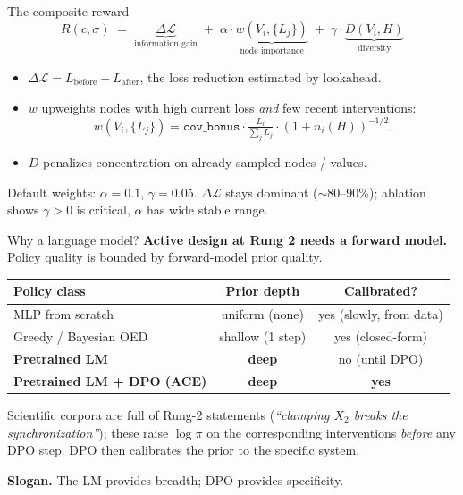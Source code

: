 \documentclass[aspectratio=169,10pt]{beamer}
\begin{document}
\begin{frame}{The composite reward}
\[
R(c,\sigma) \;=\; \underbrace{\Delta\mathcal{L}}_{\text{information gain}}
                  \;+\; \alpha\!\cdot\!\underbrace{w(V_i,\{L_j\})}_{\text{node importance}}
                  \;+\; \gamma\!\cdot\!\underbrace{D(V_i,H)}_{\text{diversity}}
\]
\begin{itemize}
\item $\Delta\mathcal{L} = L_\text{before}\!-\!L_\text{after}$, the loss reduction estimated by lookahead.
\item $w$ upweights nodes with high current loss \emph{and} few recent interventions:
  \[ w(V_i,\{L_j\})=\texttt{cov\_bonus}\cdot\tfrac{L_i}{\sum_j L_j}\cdot(1+n_i(H))^{-1/2}.\]
\item $D$ penalizes concentration on already-sampled nodes / values.
\end{itemize}
\smallskip
Default weights: $\alpha=0.1$, $\gamma=0.05$. $\Delta\mathcal{L}$ stays dominant
($\sim$80--90\%); ablation shows $\gamma\!>\!0$ is critical, $\alpha$ has wide stable range.
\end{frame}

\begin{frame}{Why a language model?}
\textbf{Active design at Rung 2 needs a forward model.}
Policy quality is bounded by forward-model prior quality.
\medskip

\centering
\small
\begin{tabular}{@{}lcc@{}}
\toprule
Policy class & Prior depth & Calibrated? \\
\midrule
MLP from scratch          & uniform (none)    & yes (slowly, from data) \\
Greedy / Bayesian OED      & shallow (1 step)  & yes (closed-form) \\
\textbf{Pretrained LM}     & \textbf{deep}     & no (until DPO) \\
\textbf{Pretrained LM + DPO (ACE)} & \textbf{deep} & \textbf{yes} \\
\bottomrule
\end{tabular}
\flushleft
\medskip
\small
Scientific corpora are full of Rung-2 statements
(\emph{``clamping $X_2$ breaks the synchronization''}); these raise $\log\pi$ on the
corresponding interventions \emph{before} any DPO step.
DPO then calibrates the prior to the specific system.
\smallskip

\textbf{Slogan.} The LM provides breadth; DPO provides specificity.
\end{frame}
\end{document}
